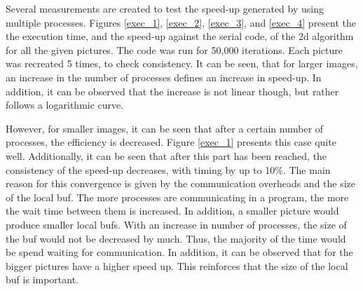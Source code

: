 \documentclass[11pt]{article}
\begin{document}
	Several measurements are created to test the speed-up generated by using multiple processes. Figures \ref{exec_1}, \ref{exec_2}, \ref{exec_3}, and \ref{exec_4} present the the execution time, and the speed-up against the serial code, of the 2d algorithm for all the given pictures. The code was run for 50,000 iterations. Each picture was recreated 5 times, to check consistency. It can be seen, that for larger images, an increase in the number of processes defines an increase in speed-up. In addition, it can be observed that the increase is not linear though, but rather follows a logarithmic curve. 
	
	However, for smaller images, it can be seen that after a certain number of processes, the efficiency is decreased. Figure \ref{exec_1} presents this case quite well. Additionally, it can be seen that after this part has been reached, the consistency of the speed-up decreases, with timing by up to 10\%. The main reason for this convergence is given by the communication overheads and the size of the local buf. The more processes are communicating in a program, the more the wait time between them is increased. In addition, a smaller picture would produce smaller local bufs. With an increase in number of processes, the size of the buf would not be decreased by much. Thus, the majority of the time would be spend waiting for communication. In addition, it can be observed that for the bigger pictures have a higher speed up. This reinforces that the size of the local buf is important.
	
\end{document}
